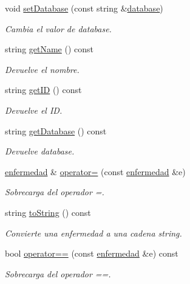 \begin{DoxyCompactItemize}
void \hyperlink{classenfermedad_ac1f009307d52232420a72264e9c2ce3f}{set\+Database} (const string \&\hyperlink{classenfermedad_a3684b7ec850d4c9357dd21bdd5e02803}{database})
\begin{DoxyCompactList}\small\item\em Cambia el valor de database. \end{DoxyCompactList}\item 
string \hyperlink{classenfermedad_ac45bc03880429b312ba05c6277d5043f}{get\+Name} () const
\begin{DoxyCompactList}\small\item\em Devuelve el nombre. \end{DoxyCompactList}\item 
string \hyperlink{classenfermedad_aed3bb5ee6da05d6ccd56e648da3ae429}{get\+ID} () const
\begin{DoxyCompactList}\small\item\em Devuelve el ID. \end{DoxyCompactList}\item 
string \hyperlink{classenfermedad_afdc354a1fe894cc0ce209bcdccf86421}{get\+Database} () const
\begin{DoxyCompactList}\small\item\em Devuelve database. \end{DoxyCompactList}\item 
\hyperlink{classenfermedad}{enfermedad} \& \hyperlink{classenfermedad_a795be16b7e3e6a858211ff20a62c9d85}{operator=} (const \hyperlink{classenfermedad}{enfermedad} \&e)
\begin{DoxyCompactList}\small\item\em Sobrecarga del operador =. \end{DoxyCompactList}\item 
string \hyperlink{classenfermedad_a79487a17f935b7d0e7b90e1a9a8f983c}{to\+String} () const
\begin{DoxyCompactList}\small\item\em Convierte una enfermedad a una cadena string. \end{DoxyCompactList}\item 
bool \hyperlink{classenfermedad_a8e73dc135566f6ef73c2d66ca4dcf04a}{operator==} (const \hyperlink{classenfermedad}{enfermedad} \&e) const
\begin{DoxyCompactList}\small\item\em Sobrecarga del operador ==. \end{DoxyCompactList}\item 

\end{DoxyCompactItemize}
